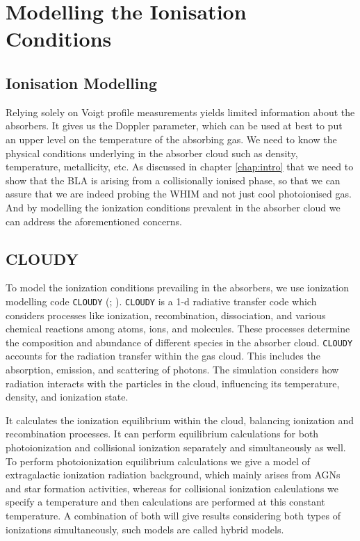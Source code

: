 \chapter{Modelling the Ionisation Conditions}  \label{chap:Ion-Model}

\section{Ionisation  Modelling}

Relying solely on Voigt profile measurements yields limited information about the absorbers. It gives us the Doppler parameter, which can be used at best to put an upper level on the temperature of the absorbing gas. We need to know the physical conditions underlying in the absorber cloud such as density, temperature, metallicity, etc. As discussed in chapter \ref{chap:intro} that we need to show that the BLA is arising from a collisionally ionised phase, so that we can assure that we are indeed probing the WHIM and not just cool photoionised gas. And by modelling the ionization conditions prevalent in the absorber cloud we can address the aforementioned concerns.

\section{CLOUDY} \label{sec:Cloudy}

To model the ionization conditions prevailing in the absorbers, we use ionization modelling code {\tt CLOUDY} (\citet{Ferland-1998}; \citeyear{cloudy}). {\tt CLOUDY} is a 1-d radiative transfer code which considers processes like ionization, recombination, dissociation, and various chemical reactions among atoms, ions, and molecules. These processes determine the composition and abundance of different species in the absorber cloud.  {\tt CLOUDY} accounts for the radiation transfer within the gas cloud. This includes the absorption, emission, and scattering of photons. The simulation considers how radiation interacts with the particles in the cloud, influencing its temperature, density, and ionization state.

It calculates the ionization equilibrium within the cloud, balancing ionization and recombination processes. It can perform equilibrium calculations for both photoionization and collisional ionization separately and simultaneously as well. To perform photoionization equilibrium calculations we give a model of extragalactic ionization radiation background, which mainly arises from AGNs and star formation activities, whereas for collisional ionization calculations we specify a temperature and then calculations are performed at this constant temperature. A combination of both will give results considering both types of ionizations simultaneously, such models are called hybrid models. 

